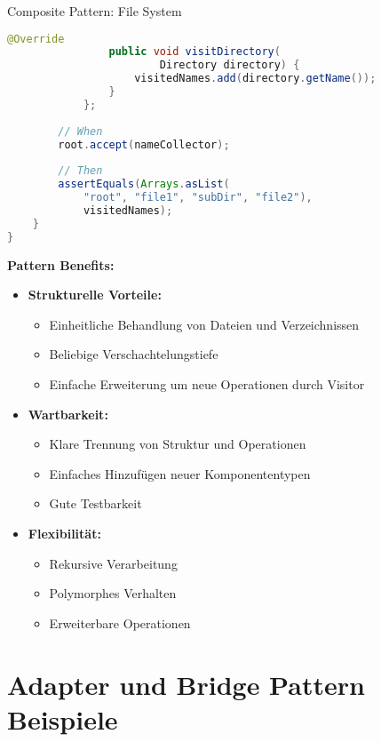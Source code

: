 \begin{example2}[breakable]{Composite Pattern: File System}
\begin{lstlisting}[language=Java, style=basesmol]
                @Override
                public void visitDirectory(
                        Directory directory) {
                    visitedNames.add(directory.getName());
                }
            };
            
        // When
        root.accept(nameCollector);
        
        // Then
        assertEquals(Arrays.asList(
            "root", "file1", "subDir", "file2"), 
            visitedNames);
    }
}
\end{lstlisting}

\textbf{Pattern Benefits:}
\begin{itemize}
    \item \textbf{Strukturelle Vorteile:}
    \begin{itemize}
        \item Einheitliche Behandlung von Dateien und Verzeichnissen
        \item Beliebige Verschachtelungstiefe
        \item Einfache Erweiterung um neue Operationen durch Visitor
    \end{itemize}
    
    \item \textbf{Wartbarkeit:}
    \begin{itemize}
        \item Klare Trennung von Struktur und Operationen
        \item Einfaches Hinzufügen neuer Komponententypen
        \item Gute Testbarkeit
    \end{itemize}
    
    \item \textbf{Flexibilität:}
    \begin{itemize}
        \item Rekursive Verarbeitung
        \item Polymorphes Verhalten
        \item Erweiterbare Operationen
    \end{itemize}
\end{itemize}
\end{example2}

\section{Adapter und Bridge Pattern Beispiele}

